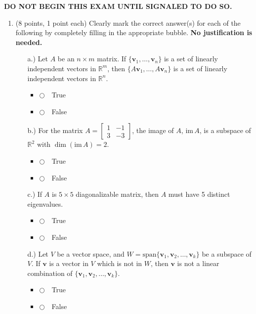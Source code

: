 \documentclass[12pt]{extarticle}
\newcommand{\chooseone}{{\Large$\Circle$\ \ }}
\begin{document}
\bigskip

\textbf{DO NOT BEGIN THIS EXAM UNTIL SIGNALED TO DO SO.}



\newpage



\begin{enumerate}

  \item (8 points, 1 point each)  Clearly mark the correct answer(s) for each of the following by completely filling in the appropriate bubble.  \textbf{No justification is needed.}
\begin{itemize}

\item[a.)] %
Let $A$ be an $n\times m$ matrix. If $\{\mathbf v_1,\dots,\mathbf v_n\}$ is a set of linearly independent vectors in $\mathbb R^m$, then $\{A\mathbf v_1,\dots,A\mathbf v_n\}$ is a set of linearly independent vectors in $\mathbb R^n$. 
\begin{itemize}[label={}] 
\item \chooseone True
\item \chooseone False
\end{itemize}

\vspace{2cm}

\item[b.)] For the matrix $A=\begin{bmatrix} 1 & -1 \\ 3 & -3 \end{bmatrix}$, the image of $A$, $\text{im}\, A$, is a subspace of $\mathbb{R}^2$ with $\dim(\text{im}\, A)=2$. 

\begin{itemize}[label={}]
\item \chooseone True
\item \chooseone False
\end{itemize}
\vspace{2cm}

\item[c.)] If $A$ is $5\times 5$ diagonalizable matrix, then $A$ must have 5 distinct eigenvalues.
\begin{itemize}[label={}]
\item \chooseone True
\item \chooseone False
\end{itemize}
\vspace{2cm}

\item[d.)] Let $V$ be a vector space, and $W=\text{span}\{\mathbf{v}_1,\mathbf{v}_2,\ldots,\mathbf{v}_k\}$ be a subspace of $V$. If $\mathbf{v}$ is a vector in $V$ which is not in $W$, then $\mathbf{v}$ is not a linear combination of $\{\mathbf{v}_1,\mathbf{v}_2,\ldots,\mathbf{v}_k\}$.
\begin{itemize}[label={}] 
\item \chooseone True
\item \chooseone False
\end{itemize}
\vspace{2cm}


\end{itemize}
\end{enumerate}
\end{document}
